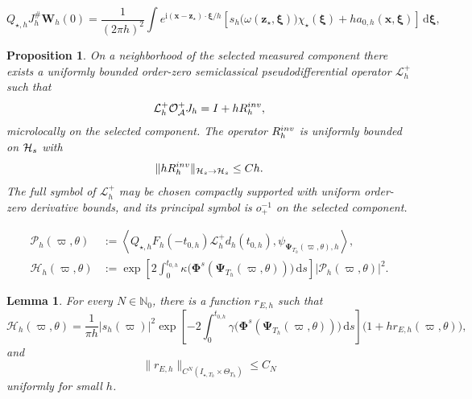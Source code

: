\documentclass[10pt,a4paper]{amsart}
\newtheorem{proposition}{Proposition}
\newtheorem{lemma}{Lemma}
\newcommand{\dd}{\,\mathrm{d}}
\newcommand{\ii}{\mathrm{i}}
\begin{document}
\begin{equation}\label{eq:source-state-before-time-derivative}
 Q_{\star,h}J_h^{\#}\bm W_h(0)
 =\frac1{(2\pi h)^2}\int e^{\ii(\bm x-\bm z_\star)\cdot\bm\xi/h}
 \left[s_h\bigl(\omega(\bm z_\star,\bm\xi)\bigr)\chi_\star(\bm\xi)
 +h a_{0,h}(\bm x,\bm\xi)\right]\dd\bm\xi,
\end{equation}

\begin{proposition}\label{prop:inverse-oa}
On a neighborhood of the selected measured component there exists a uniformly bounded order-zero semiclassical pseudodifferential operator $\mathcal L_h^+$ such that
\begin{equation}\label{eq:observation-inverse}
    \mathcal L_h^+\mathcal O_{\mathcal A}^+J_h
    = I+hR_h^{\rm inv},
\end{equation}
microlocally on the selected component. The operator $R_h^{\rm inv}$ is uniformly bounded on $\mathcal H_{\rm s}$ with
\begin{equation*}
 \|hR_h^{\rm inv}\|_{\mathcal H_{\rm s}\to\mathcal H_{\rm s}}\le Ch.
\end{equation*}
The full symbol of $\mathcal L_h^+$ may be chosen compactly supported with uniform order-zero derivative bounds, and its principal symbol is $o_+^{-1}$ on the selected component.
\end{proposition}

\begin{equation}\label{eq:measured-coefficient}
 \begin{aligned}
 \mathscr P_h(\varpi,\theta)
 &:=\left\langle
 Q_{\star,h}F_h(-t_{0,h})\mathcal L_h^+d_h(t_{0,h}),
 \psi_{\bm\Psi_{T_h}(\varpi,\theta),h}\right\rangle,\\
 \mathcal H_h(\varpi,\theta)
 &:=\exp\left[2\int_0^{t_{0,h}}
 \kappa\bigl(\bm\Phi^s(\bm\Psi_{T_h}(\varpi,\theta))\bigr)\dd s\right]
 |\mathscr P_h(\varpi,\theta)|^2.
 \end{aligned}
\end{equation}

\begin{lemma}
For every $N\in\mathbb N_0$, there is a function $r_{E,h}$ such that
\begin{equation}\label{eq:measured-energy}
 \mathcal H_h(\varpi,\theta)
 =\frac{1}{\pi h}|s_h(\varpi)|^2
 \exp\left[-2\int_0^{t_{0,h}}
 \gamma\bigl(\bm\Phi^s(\bm\Psi_{T_h}(\varpi,\theta))\bigr)\dd s\right]
 \bigl(1+h r_{E,h}(\varpi,\theta)\bigr),
\end{equation}
and
\begin{equation*}
 \|r_{E,h}\|_{C^N(I_{\star,T_h}\times\Theta_{T_h})}\le C_N
\end{equation*}
uniformly for small $h$.
\end{lemma}
\end{document}
